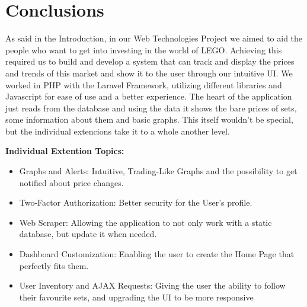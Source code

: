 \section{Conclusions}

As said in the Introduction, in our Web Technologies Project we aimed to aid the people who want to get into investing in the world of LEGO. 
Achieving this required us to build and develop a system that can track and display the prices and trends of this market and show it to the user through our intuitive UI.
We worked in PHP with the Laravel Framework, utilizing different libraries and Javascript for ease of use and a better experience. \n
The heart of the application just reads from the database and using the data it shows the bare prices of sets, some information about them and basic graphs. 
This itself wouldn't be special, but the individual extencions take it to a whole another level.


\textbf{Individual Extention Topics:}
\begin{itemize}
    \item Graphs and Alerts: Intuitive, Trading-Like Graphs and the possibility to get notified about price changes.
    \item Two-Factor Authorization: Better security for the User's profile.
    \item Web Scraper: Allowing the application to not only work with a static database, but update it when needed.
    \item Dashboard Customization: Enabling the user to create the Home Page that perfectly fits them.
    \item User Inventory and AJAX Requests: Giving the user the ability to follow their favourite sets, and upgrading the UI to be more responsive
\end{itemize}


